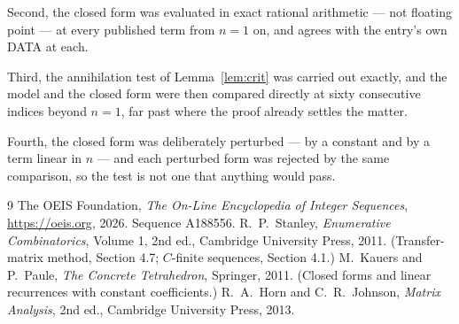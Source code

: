 \documentclass[11pt,a4paper]{article}
\theoremstyle{plain}
\theoremstyle{definition}
\begin{document}
Second, the closed form was evaluated in exact rational arithmetic --- not floating point ---
at every published term from $n=1$ on, and agrees with the entry's own DATA at each.

Third, the annihilation test of Lemma~\ref{lem:crit} was carried out exactly, and the model
and the closed form were then compared directly at sixty consecutive indices beyond
$n=1$, far past where the proof already settles the matter.

Fourth, the closed form was deliberately perturbed --- by a constant and by a term linear in
$n$ --- and each perturbed form was rejected by the same comparison, so the test is not one
that anything would pass.

\begin{thebibliography}{9}
 The OEIS Foundation, \emph{The On-Line Encyclopedia of Integer
Sequences}, \url{https://oeis.org}, 2026. Sequence A188556.
 R.~P.~Stanley, \emph{Enumerative Combinatorics}, Volume 1, 2nd ed.,
Cambridge University Press, 2011. (Transfer-matrix method, Section 4.7; $C$-finite sequences,
Section 4.1.)
 M.~Kauers and P.~Paule, \emph{The Concrete Tetrahedron}, Springer, 2011.
(Closed forms and linear recurrences with constant coefficients.)
 R.~A.~Horn and C.~R.~Johnson, \emph{Matrix Analysis}, 2nd ed., Cambridge
University Press, 2013.
\end{thebibliography}
\end{document}
